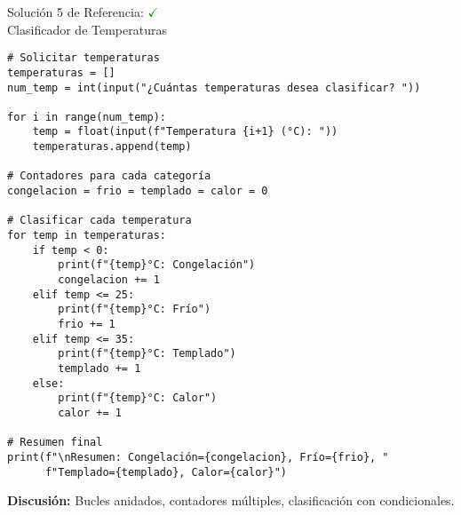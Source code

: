 \documentclass[10pt]{beamer}
\begin{document}
\begin{frame}[fragile]{Solución 5 de Referencia: \hfill \textcolor{green}{$\checkmark$} \\ Clasificador de Temperaturas}
\begin{verbatim}
# Solicitar temperaturas
temperaturas = []
num_temp = int(input("¿Cuántas temperaturas desea clasificar? "))

for i in range(num_temp):
    temp = float(input(f"Temperatura {i+1} (°C): "))
    temperaturas.append(temp)

# Contadores para cada categoría
congelacion = frio = templado = calor = 0

# Clasificar cada temperatura
for temp in temperaturas:
    if temp < 0:
        print(f"{temp}°C: Congelación")
        congelacion += 1
    elif temp <= 25:
        print(f"{temp}°C: Frío")
        frio += 1
    elif temp <= 35:
        print(f"{temp}°C: Templado")
        templado += 1
    else:
        print(f"{temp}°C: Calor")
        calor += 1

# Resumen final
print(f"\nResumen: Congelación={congelacion}, Frío={frio}, "
      f"Templado={templado}, Calor={calor}")
\end{verbatim}
\textbf{Discusión:} Bucles anidados, contadores múltiples, clasificación con condicionales.
\end{frame}


\end{document}

